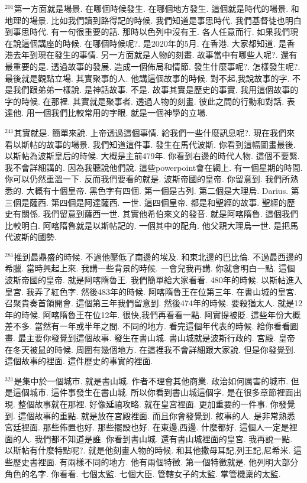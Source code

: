\documentclass{book}
\begin{document}
$^{201}$第一方面就是場景.
在哪個時候發生.
在哪個地方發生.
這個就是時代的場景.
和地理的場景.
比如我們讀到路得記的時候.
我們知道是事思時代.
我們基督徒也明白到事思時代.
有一句很重要的話.
那時以色列中沒有王.
各人任意而行.
如果我們現在說這個講座的時候.
在哪個時候呢?.
是2020年的5月.
在香港.
大家都知道.
是香港去年到現在發生的事情.
另一方面就是人物的刻畫.
故事當中有哪些人呢?.
還有最重要的是.
透過故事的發展.
造成一個佈局和情節.
發生什麼事呢?.
怎樣發生呢?.
最後就是觀點立場.
其實聚事的人.
他講這個故事的時候.
對不起,我說故事的字.
不是我們跟弟弟一樣說.
是神話故事.
不是.
故事其實是歷史的事實.
我用這個故事的字的時候.
在那裡.
其實就是聚事者.
透過人物的刻畫.
彼此之間的行動和對話.
表達他.
用一個我們比較常用的字眼.
就是一個神學的立場.

$^{241}$其實就是.
簡單來說.
上帝透過這個事情.
給我們一些什麼訊息呢?.
現在我們來看以斯帖的故事的場景.
我們知道這件事.
發生在馬代波斯.
你看到這幅圖畫最後.
以斯帖為波斯皇后的時候.
大概是主前479年.
你看到右邊的時代人物.
這個不要緊.
我不會詳細講的.
因為我聽說他們說.
這些powerpoint會在網上.
有一個星期的時間.
你可以仍然重溫一下.
反而我們要看的就是.
波斯帝國的皇帝.
你留意到.
我們所熟悉的.
大概有十個皇帝.
黑色字有四個.
第一個是古列.
第二個是大理烏.
Darius.
第三個是薩西.
第四個是阿達薩西.
一世.
這四個皇帝.
都是和聖經的故事.
聖經的歷史有關係.
我們留意到薩西一世.
其實他希伯來文的發音.
就是阿喀隋魯.
這個我們比較明白.
阿喀隋魯就是以斯帖記的.
一個其中的配角.
他父親大理烏一世.
是把馬代波斯的國勢.

$^{281}$推到最鼎盛的時候.
不過他壓低了南邊的埃及.
和東北邊的巴比倫.
不過最西邊的希臘.
當時興起上來.
我講一些背景的時候.
一會兒我再講.
你就會明白一點.
這個波斯帝國的皇帝.
就是阿喀隋魯王.
我們簡單給大家看看.
480年的時候.
以斯帖進入皇宮.
我弄了紅色字.
然後483年的時候.
阿喀隋魯王在位第三年.
在書山城的皇宮.
召聚貴奏首領開會.
這個第三年我們留意到.
然後474年的時候.
要殺猶太人.
就是12年的時候.
阿喀隋魯王在位12年.
很快,我們再看看一點.
阿實提被貶.
這些年份大概差不多.
當然有一年或半年之間.
不同的地方.
看完這個年代表的時候.
給你看看圖畫.
最主要你發覺到這個故事.
發生在書山城.
書山城就是波斯行政的.
宮殿.
皇帝在冬天被鼠的時候.
周圍有幾個地方.
在這裡我不會詳細跟大家說.
但是你發覺到.
這個故事的裡面.
這件歷史的事實的裡面.

$^{321}$是集中於一個城市.
就是書山城.
作者不理會其他商業.
政治如何厲害的城市.
但是這個城市.
這件事發生在書山城.
所以你看到書山城這個字.
是在很多章節裡面出現.
整個故事就在那裡.
好像延禧攻略.
就在皇宮裡面.
更加重要的一件事.
你發覺到.
這個故事的重點.
就是放在宮殿裡面.
而且你會發覺到.
敘事的人.
是非常熟悉宮廷裡面.
那些佈置也好.
那些擺設也好.
在東邊,西邊.
什麼都好.
這個人一定是裡面的人.
我們都不知道是誰.
你看到書山城.
還有書山城裡面的皇宮.
我再說一點.
以斯帖有什麼特點呢?.
就是他刻畫人物的時候.
和其他撒母耳記,列王記,尼希米.
這些歷史書裡面.
有兩樣不同的地方.
他有兩個特徵.
第一個特徵就是.
他列明大部分角色的名字.
你看看.
七個太監.
七個大臣.
管轄女子的太監.
掌管機稟的太監.
\end{document}

